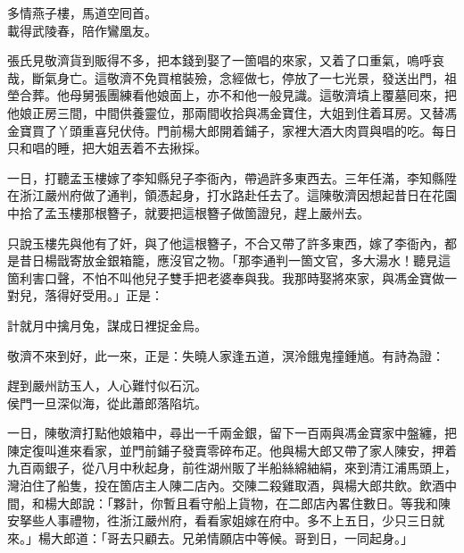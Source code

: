 \begin{myquote}
多情燕子樓，馬道空囘首。\\載得武陵春，陪作鸞凰友。
\end{myquote}

張氏見敬濟貨到販得不多，把本錢到娶了一箇唱的來家，又着了口重氣，嗚呼哀哉，斷氣身亡。{}這敬濟不免買棺裝殮，念經做七，停放了一七光景，發送出門，祖塋合葬。他母舅張團練看他娘面上，亦不和他一般見識。{}這敬濟墳上覆墓囘來，把他娘正房三間，中間供養靈位，那兩間收拾與馮金寶住，大姐到住着耳房。又替馮金寶買了丫頭重喜兒伏侍。門前楊大郎開着鋪子，家裡大酒大肉買與唱的吃。每日只和唱的睡，把大姐丟着不去揪採。

一日，打聽孟玉樓嫁了李知縣兒子李衙內，帶過許多東西去。三年任滿，李知縣陞在浙江嚴州府做了通判，領憑起身，打水路赴任去了。這陳敬濟因想起昔日在花園中拾了孟玉樓那根簪子，就要把這根簪子做箇證兒，趕上嚴州去。

只說玉樓先與他有了奸，與了他這根簪子，不合又帶了許多東西，嫁了李衙內，都是昔日楊戩寄放金銀箱籠，應沒官之物。{}「那李通判一箇文官，多大湯水！聽見這箇利害口聲，不怕不叫他兒子雙手把老婆奉與我。我那時娶將來家，與馮金寶做一對兒，落得好受用。」正是：

\begin{myquote}
計就月中擒月兔，謀成日裡捉金烏。
\end{myquote}

敬濟不來到好，此一來，正是：失曉人家逢五道，溟泠餓鬼撞鍾馗。有詩為證：

\begin{myquote}
趕到嚴州訪玉人，人心難忖似石沉。\\侯門一旦深似海，從此蕭郎落陷坑。
\end{myquote}

一日，陳敬濟打點他娘箱中，尋出一千兩金銀，留下一百兩與馮金寶家中盤纏，把陳定復叫進來看家，並門前鋪子發賣零碎布疋。他與楊大郎又帶了家人陳安，押着九百兩銀子，從八月中秋起身，前徃湖州販了半船絲綿紬絹，來到清江浦馬頭上，灣泊住了船隻，投在箇店主人陳二店內。交陳二殺雞取酒，與楊大郎共飲。飲酒中間，和楊大郎說：「夥計，你暫且看守船上貨物，{}在二郎店內畧住數日。等我和陳安拏些人事禮物，徃浙江嚴州府，看看家姐嫁在府中。多不上五日，少只三日就來。」楊大郎道：「哥去只顧去。兄弟情願店中等候。哥到日，一同起身。」

